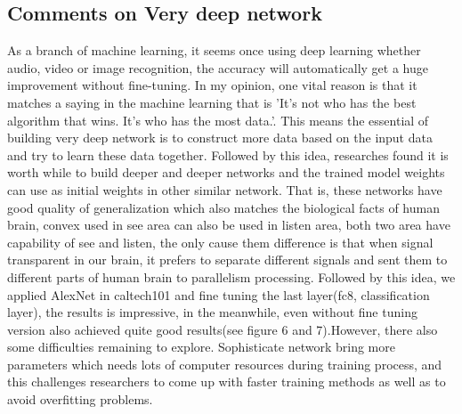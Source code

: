 \documentclass{article}
\begin{document}
\subsection{Comments on Very deep network}
As a branch of machine learning, it seems once using deep learning whether audio, video or image recognition, the accuracy will automatically get a huge improvement without fine-tuning. In my opinion, one vital reason is that it matches a saying in the machine learning that is 'It's not who has the best algorithm that wins. It's who has the most data.'. This means the essential of building very deep network is to construct more data based on the input data and try to learn these data together. Followed by this idea, researches found it is worth while to build deeper and deeper networks and the trained model weights can use as initial weights in other similar network. That is, these networks have good quality of generalization which  also matches the biological facts of human brain, convex used in see area can also be used in listen area, both two area have capability of see and listen, the only cause them difference is that when signal transparent in our brain, it prefers to separate different signals and sent them to different parts of human brain to parallelism processing. Followed by this idea, we applied AlexNet in caltech101 and fine tuning the last layer(fc8, classification layer), the results is impressive, in the meanwhile, even without fine tuning version also achieved quite good results(see figure 6 and 7).However, there also some difficulties remaining to explore. Sophisticate network bring more parameters which needs lots of computer resources during training process, and this challenges researchers to come up with faster training methods as well as to avoid overfitting problems. 
\end{document}
